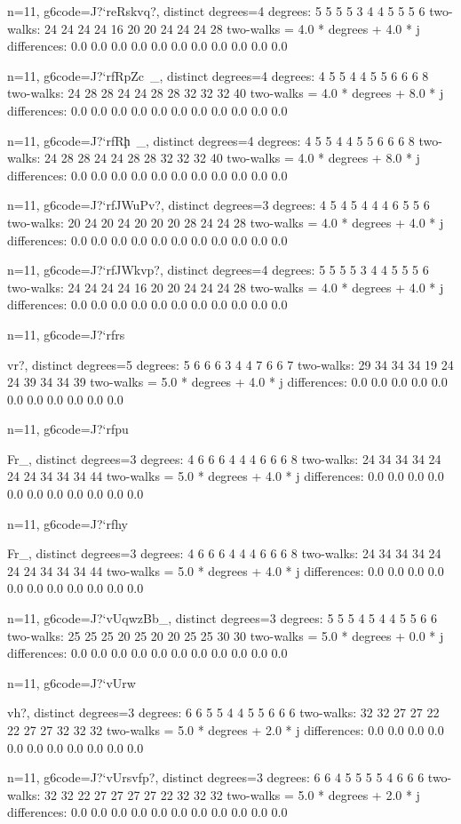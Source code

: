 {{{{{{{{{{{{{{{{{{{n=11, g6code=J?`reRskvq?, distinct degrees=4
degrees: 5 5 5 5 3 4 4 5 5 5 6 
two-walks: 24 24 24 24 16 20 20 24 24 24 28 
two-walks = 4.0 * degrees + 4.0 * j
differences: 0.0 0.0 0.0 0.0 0.0 0.0 0.0 0.0 0.0 0.0 0.0 

n=11, g6code=J?`rfRpZc~_, distinct degrees=4
degrees: 4 5 5 4 4 5 5 6 6 6 8 
two-walks: 24 28 28 24 24 28 28 32 32 32 40 
two-walks = 4.0 * degrees + 8.0 * j
differences: 0.0 0.0 0.0 0.0 0.0 0.0 0.0 0.0 0.0 0.0 0.0 

n=11, g6code=J?`rfRh\c~_, distinct degrees=4
degrees: 4 5 5 4 4 5 5 6 6 6 8 
two-walks: 24 28 28 24 24 28 28 32 32 32 40 
two-walks = 4.0 * degrees + 8.0 * j
differences: 0.0 0.0 0.0 0.0 0.0 0.0 0.0 0.0 0.0 0.0 0.0 

n=11, g6code=J?`rfJWuPv?, distinct degrees=3
degrees: 4 5 4 5 4 4 4 6 5 5 6 
two-walks: 20 24 20 24 20 20 20 28 24 24 28 
two-walks = 4.0 * degrees + 4.0 * j
differences: 0.0 0.0 0.0 0.0 0.0 0.0 0.0 0.0 0.0 0.0 0.0 

n=11, g6code=J?`rfJWkvp?, distinct degrees=4
degrees: 5 5 5 5 3 4 4 5 5 5 6 
two-walks: 24 24 24 24 16 20 20 24 24 24 28 
two-walks = 4.0 * degrees + 4.0 * j
differences: 0.0 0.0 0.0 0.0 0.0 0.0 0.0 0.0 0.0 0.0 0.0 

n=11, g6code=J?`rfrs{vr?, distinct degrees=5
degrees: 5 6 6 6 3 4 4 7 6 6 7 
two-walks: 29 34 34 34 19 24 24 39 34 34 39 
two-walks = 5.0 * degrees + 4.0 * j
differences: 0.0 0.0 0.0 0.0 0.0 0.0 0.0 0.0 0.0 0.0 0.0 

n=11, g6code=J?`rfpu}Fr_, distinct degrees=3
degrees: 4 6 6 6 4 4 4 6 6 6 8 
two-walks: 24 34 34 34 24 24 24 34 34 34 44 
two-walks = 5.0 * degrees + 4.0 * j
differences: 0.0 0.0 0.0 0.0 0.0 0.0 0.0 0.0 0.0 0.0 0.0 

n=11, g6code=J?`rfhy}Fr_, distinct degrees=3
degrees: 4 6 6 6 4 4 4 6 6 6 8 
two-walks: 24 34 34 34 24 24 24 34 34 34 44 
two-walks = 5.0 * degrees + 4.0 * j
differences: 0.0 0.0 0.0 0.0 0.0 0.0 0.0 0.0 0.0 0.0 0.0 

n=11, g6code=J?`vUqwzBb_, distinct degrees=3
degrees: 5 5 5 4 5 4 4 5 5 6 6 
two-walks: 25 25 25 20 25 20 20 25 25 30 30 
two-walks = 5.0 * degrees + 0.0 * j
differences: 0.0 0.0 0.0 0.0 0.0 0.0 0.0 0.0 0.0 0.0 0.0 

n=11, g6code=J?`vUrw{vh?, distinct degrees=3
degrees: 6 6 5 5 4 4 5 5 6 6 6 
two-walks: 32 32 27 27 22 22 27 27 32 32 32 
two-walks = 5.0 * degrees + 2.0 * j
differences: 0.0 0.0 0.0 0.0 0.0 0.0 0.0 0.0 0.0 0.0 0.0 

n=11, g6code=J?`vUrsvfp?, distinct degrees=3
degrees: 6 6 4 5 5 5 5 4 6 6 6 
two-walks: 32 32 22 27 27 27 27 22 32 32 32 
two-walks = 5.0 * degrees + 2.0 * j
differences: 0.0 0.0 0.0 0.0 0.0 0.0 0.0 0.0 0.0 0.0 0.0 

}}}}}}}}}}}}}}}}}}}
